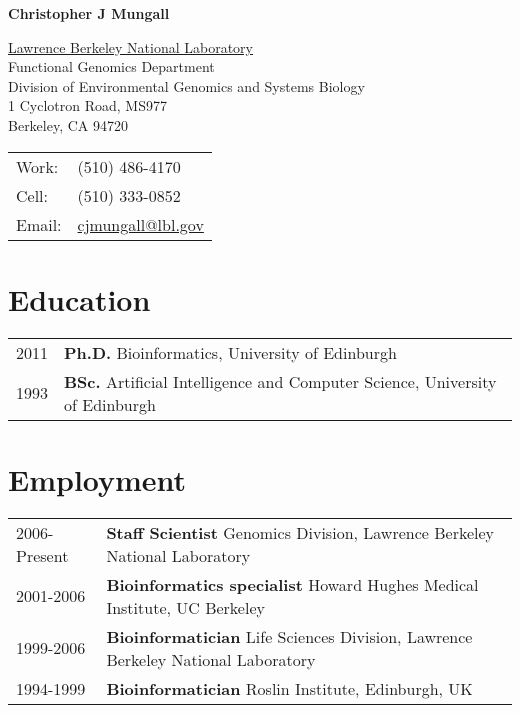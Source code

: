 \documentclass[11pt,fullpage]{article}
\def\name{Christopher J Mungall}
\begin{document}


\centerline{\Large \bf \name}

\vspace{0.25in}

\begin{minipage}{0.60\linewidth}
  \href{http://www.lbl.gov/}{Lawrence Berkeley National Laboratory} \\
  Functional Genomics Department \\
  Division of Environmental Genomics and Systems Biology \\
  1 Cyclotron Road, MS977 \\
  Berkeley, CA 94720
\end{minipage}
\begin{minipage}{0.40\linewidth}
  \begin{tabular}{ll}
    Work: & (510) 486-4170 \\
    Cell: & (510) 333-0852 \\
    Email: & \href{mailto:cjmungall@lbl.gov}{cjmungall@lbl.gov} \\
  \end{tabular}
\end{minipage}

\section*{Education}

\begin{tabular}{ll}
	2011 & {\bf Ph.D.} Bioinformatics, University of Edinburgh \\
	1993 & {\bf BSc.} Artificial Intelligence and Computer
        Science, University of Edinburgh \\
\end{tabular}

\section*{Employment}


\begin{tabular}{ll}
	2006-Present & {\bf Staff Scientist} Genomics Division, Lawrence
        Berkeley National Laboratory \\
	2001-2006 & {\bf Bioinformatics specialist} Howard Hughes
        Medical Institute, UC Berkeley \\
	1999-2006 & {\bf Bioinformatician} Life Sciences Division, Lawrence
        Berkeley National Laboratory \\
	1994-1999 & {\bf Bioinformatician} Roslin Institute,
        Edinburgh, UK \\
\end{tabular}
\end{document}
